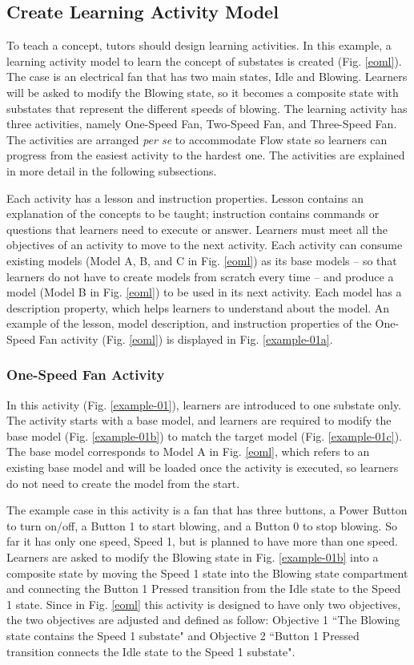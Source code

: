 \documentclass[conference]{IEEEtran}
\begin{document}
\subsection{Create Learning Activity Model}
To teach a concept, tutors should design learning activities. In this example, a learning activity model to learn the concept of substates is created (Fig. \ref{eoml}). The case is an electrical fan that has two main states, Idle and Blowing. Learners will be asked to modify the Blowing state, so it becomes a composite state with substates that represent the different speeds of blowing. The learning activity has three activities, namely One-Speed Fan, Two-Speed Fan, and Three-Speed Fan. The activities are arranged \textit{per se} to accommodate Flow state \cite{csikszentmihalyi2014toward} so learners can progress from the easiest activity to the hardest one. The activities are explained in more detail in the following subsections.
  
Each activity has a lesson and instruction properties. Lesson contains an explanation of the concepts to be taught; instruction contains commands or questions that learners need to execute or answer. Learners must meet all the objectives of an activity to move to the next activity. Each activity can consume existing models (Model A, B, and C in Fig. \ref{eoml}) as its base models -- so that learners do not have to create models from scratch every time -- and produce a model (Model B in Fig. \ref{eoml}) to be used in its next activity. Each model has a description property, which helps learners to understand about the model. An example of the lesson, model description, and instruction properties of the One-Speed Fan activity (Fig. \ref{eoml}) is displayed in Fig. \ref{example-01a}.    


\subsubsection{One-Speed Fan Activity}
In this activity (Fig. \ref{example-01}), learners are introduced to one substate only. The activity starts with a base model, and learners are required to modify the base model (Fig. \ref{example-01b}) to match the target model (Fig. \ref{example-01c}). The base model corresponds to Model A in Fig. \ref{eoml}, which refers to an existing base model and will be loaded once the activity is executed, so learners do not need to create the model from the start. 

The example case in this activity is a fan that has three buttons, a Power Button to turn on/off, a Button 1 to start blowing, and a Button 0 to stop blowing. So far it has only one speed, Speed 1, but is planned to have more than one speed. Learners are asked to modify the Blowing state in Fig. \ref{example-01b} into a composite state by moving the Speed 1 state into the Blowing state compartment and connecting the Button 1 Pressed transition from the Idle state to the Speed 1 state. Since in Fig. \ref{eoml} this activity is designed to have only two objectives, the two objectives are adjusted and defined as follow: Objective 1 ``The Blowing state contains the Speed 1 substate" and Objective 2 ``Button 1 Pressed transition connects the Idle state to the Speed 1 substate".
\end{document}
